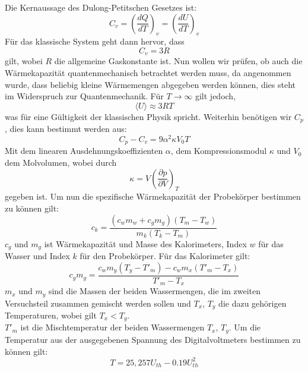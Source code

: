 Die Kernaussage des Dulong-Petitschen Gesetzes ist:
\[
C_v = (\frac{dQ}{dT})_v = (\frac{dU}{dT})_v
\]
Für das klassische System geht dann hervor, dass
\[
C_v = 3R
\]
gilt, wobei $R$ die allgemeine Gaskonstante ist.
Nun wollen wir prüfen, ob auch die Wärmekapazität quantenmechanisch betrachtet werden muss, da angenommen wurde, dass beliebig kleine Wärmemengen abgegeben werden können, dies steht im Widerspruch zur Quantenmechanik.
Für $T \longrightarrow \infty$ gilt jedoch,
\[
\langle U \rangle \approx 3RT
\]
was für eine Gültigkeit der klassischen Physik spricht.
Weiterhin benötigen wir $C_p$, dies kann bestimmt werden aus:
\[
C_p - C_v = 9\alpha ^2\kappa V_0T
\]
Mit dem linearen Ausdehnungskoeffizienten $\alpha$, dem Kompressionsmodul $\kappa$ und $V_0$ dem Molvolumen, wobei durch
\[
\kappa = V\left(\frac{\partial p}{\partial V} \right)_T
\] 
gegeben ist.
Um nun die spezifische Wärmekapazität der Probekörper bestimmen zu können gilt:
\[
c_k = \frac{(c_wm_w + c_gm_g)(T_m - T_w)}{m_k(T_k - T_m)}
\]
$c_g$ und $m_g$ ist Wärmekapazität und Masse des Kalorimeters, Index $w$ für das Wasser und Index $k$ für den Probekörper.
Für das Kalorimeter gilt:
\[
c_gm_g = \frac{c_wm_y(T_y - T'_m) - c_wm_x(T'_m - T_x)}{T'_m - T_x}
\]
$m_x$ und $m_y$ sind die Massen der beiden Wassermengen, die im zweiten Versuchsteil zusammen gemischt werden sollen und $T_x$, $T_y$ die dazu gehörigen Temperaturen, wobei gilt $T_x < T_y$. \\
$T'_m$ ist die Mischtemperatur der beiden Wassermengen $T_x$, $T_y$.
Um die Temperatur aus der ausgegebenen Spannung des Digitalvoltmeters bestimmen zu können gilt:
\[
T = 25,257U_{th} - 0.19U_{th}^2
\]
